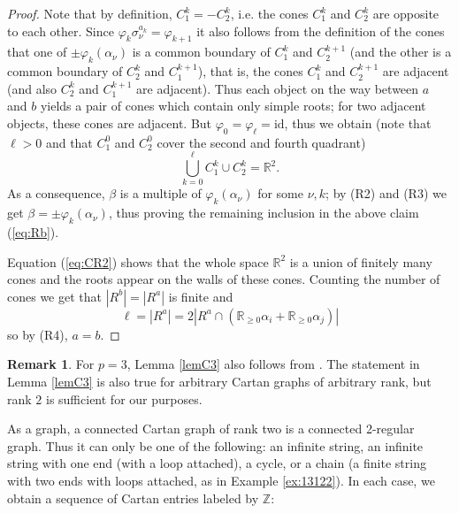 \documentclass[11pt,a4paper]{amsart}
\theoremstyle{definition}
\newtheorem{Remark}[Lemma]{Remark}
\numberwithin{equation}{section}
\newcommand{\id }{\mathrm{id}}
\begin{document}
\begin{proof}
Note that by definition, $C_1^k=-C_2^k$, i.e.
the cones 
$C_1^k$ and $C_2^k$ are opposite to each other. 
Since $\varphi_k \sigma_{\nu}^{a_k}=
\varphi_{k+1}$ it also follows from the 
definition of the cones that 
one of $\pm \varphi_k(\alpha_{\nu})$
is a common boundary of $C_1^k$ and $C_2^{k+1}$
(and the other is a common boundary of
$C_2^k$ and $C_1^{k+1}$), that is, 
the cones $C_1^k$ and $C_2^{k+1}$ are
adjacent (and also $C_2^k$ and $C_1^{k+1}$
are adjacent).
Thus each object on the way between $a$ and $b$ yields a pair of cones which contain only simple roots; for two adjacent objects, these cones are adjacent.
But $\varphi_0=\varphi_\ell=\id$, thus we obtain (note that $\ell>0$ and that $C_1^0$ 
and $C_2^0$ cover the second and fourth 
quadrant)
\begin{equation}\label{eq:CR2}
\bigcup_{k=0}^\ell C_1^k\cup C_2^k = \mathbb{R}^2.
\end{equation}
As a consequence, $\beta$ is a multiple of $\varphi_k(\alpha_\nu)$ for some $\nu,k$; by (R2) 
and (R3) we get $\beta=\pm\varphi_k(\alpha_\nu)$, thus proving
the remaining inclusion in the above claim
(\ref{eq:Rb}).

Equation (\ref{eq:CR2}) shows that the whole
space $\mathbb{R}^2$ is a union of finitely
many cones and the roots appear on the 
walls of these cones. Counting the number 
of cones we get that 
$|R^b|=|R^a|$ is finite and 
$$\ell=|R^a|=2|R^a \cap (\mathbb{R}_{\ge 0} \alpha_i + \mathbb{R}_{\ge 0} \alpha_j)|$$ 
so by (R4), $a=b$.
\end{proof}



\begin{Remark}
For $p=3$, Lemma \ref{lemC3} also follows from \cite[Theorem 1]{p-HY08}.
The statement in Lemma \ref{lemC3} is also true for arbitrary Cartan graphs of arbitrary rank, but rank $2$ is sufficient for our purposes.
\end{Remark}

As a graph, a connected Cartan graph of rank two is a connected 2-regular graph.
Thus it
can only be one of the following:
an infinite string, an infinite string with one end (with a loop attached), 
a cycle, or a chain (a finite string with two ends with loops attached, as in 
Example \ref{ex:13122}). In each case, we obtain a sequence of Cartan entries labeled by $\mathbb{Z}$:
\end{document}
